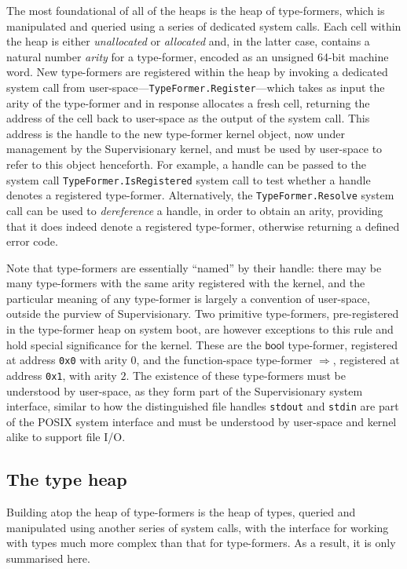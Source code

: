 \documentclass[a4paper, UKenglish, cleveref, autoref, thm-restate, colorlinks]{lipics-v2021}
\begin{document}
The most foundational of all of the heaps is the heap of type-formers, which is manipulated and queried using a series of dedicated system calls.
Each cell within the heap is either \emph{unallocated} or \emph{allocated} and, in the latter case, contains a natural number \emph{arity} for a type-former, encoded as an unsigned 64-bit machine word.
New type-formers are registered within the heap by invoking a dedicated system call from user-space---\texttt{TypeFormer.Register}---which takes as input the arity of the type-former and in response allocates a fresh cell, returning the address of the cell back to user-space as the output of the system call.
This address is the handle to the new type-former kernel object, now under management by the Supervisionary kernel, and must be used by user-space to refer to this object henceforth.
For example, a handle can be passed to the system call \texttt{TypeFormer.IsRegistered} system call to test whether a handle denotes a registered type-former.
Alternatively, the \texttt{TypeFormer.Resolve} system call can be used to \emph{dereference} a handle, in order to obtain an arity, providing that it does indeed denote a registered type-former, otherwise returning a defined error code.

Note that type-formers are essentially ``named'' by their handle: there may be many type-formers with the same arity registered with the kernel, and the particular meaning of any type-former is largely a convention of user-space, outside the purview of Supervisionary.
Two primitive type-formers, pre-registered in the type-former heap on system boot, are however exceptions to this rule and hold special significance for the kernel.
These are the $\mathsf{bool}$ type-former, registered at address \texttt{0x0} with arity $0$, and the function-space type-former $\Rightarrow$, registered at address \texttt{0x1}, with arity $2$.
The existence of these type-formers must be understood by user-space, as they form part of the Supervisionary system interface, similar to how the distinguished file handles \texttt{stdout} and \texttt{stdin} are part of the POSIX system interface and must be understood by user-space and kernel alike to support file I/O.

\subsection{The type heap}

Building atop the heap of type-formers is the heap of types, queried and manipulated using another series of system calls, with the interface for working with types much more complex than that for type-formers.
As a result, it is only summarised here.
\end{document}
